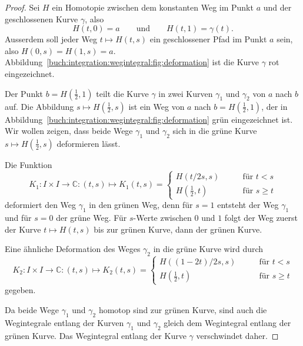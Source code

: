 \begin{proof}
Sei $H$ ein Homotopie zwischen dem konstanten Weg im Punkt $a$ und
der geschlossenen Kurve $\gamma$, also
\[
H(t,0) = a
\qquad
\text{und}
\qquad
H(t,1) = \gamma(t).
\]
Ausserdem soll jeder Weg $t\mapsto H(t,s)$ ein geschlossener Pfad im
Punkt $a$ sein, also $H(0,s)=H(1,s)=a$.
Abbildung~\ref{buch:integration:wegintegral:fig:deformation}
ist die Kurve $\gamma$ rot eingezeichnet.

Der Punkt $b=H(\frac12,1)$ teilt die Kurve $\gamma$ in zwei Kurven
$\gamma_1$ und $\gamma_2$ von $a$ nach $b$ auf.
Die Abbildung $s\mapsto H(\frac12,s)$ ist ein Weg von $a$ nach
$b=H(\frac12,1)$, der in
Abbildung~\ref{buch:integration:wegintegral:fig:deformation}
grün eingezeichnet ist.
Wir wollen zeigen, dass beide Wege $\gamma_1$ und $\gamma_2$ sich in
die grüne Kurve $s\mapsto H(\frac12,s)$ deformieren lässt.

Die Funktion 
\[
K_1
\colon
I\times I
\to
\mathbb{C}
:
(t,s)
\mapsto
K_1(t,s)
=
\begin{cases}
H(t/2s,s)    &\qquad\text{für $t  <  s$}
\\
H(\frac12, t)&\qquad\text{für $s \ge t$}
\end{cases}
\]
deformiert den Weg $\gamma_1$ in den grünen Weg,
denn für $s=1$ entsteht der Weg $\gamma_1$ und
für $s=0$ der grüne Weg.
Für $s$-Werte zwischen $0$ und $1$ folgt der Weg zuerst
der Kurve $t\mapsto H(t,s)$ bis zur grünen Kurve, dann der grünen
Kurve.

Eine ähnliche Deformation des Weges $\gamma_2$ in die grüne
Kurve wird durch
\[
K_2
\colon
I\times I
\to
\mathbb{C}
:
(t,s)
\mapsto
K_2(t,s)
=
\begin{cases}
H((1-2t)/2s,s)    &\qquad\text{für $t  <   s$}
\\
H(\frac12, t)     &\qquad\text{für $s \ge t$}
\end{cases}
\]
gegeben.

Da beide Wege $\gamma_1$ und $\gamma_2$ homotop sind zur
grünen Kurve, sind auch die Wegintegrale entlang der Kurven $\gamma_1$
und $\gamma_2$ gleich dem Wegintegral entlang der grünen Kurve.
Das Wegintegral entlang der Kurve $\gamma$ verschwindet daher.
\end{proof}


